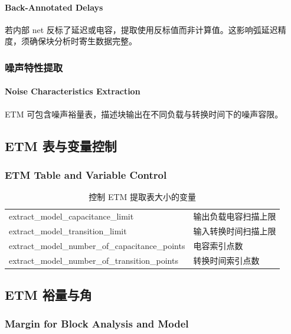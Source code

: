 \paragraph*{Back-Annotated Delays}

若内部 net 反标了延迟或电容，提取使用反标值而非计算值。这影响弧延迟精度，须确保块分析时寄生数据完整。

\subsubsection{噪声特性提取}
\paragraph*{Noise Characteristics Extraction}

ETM 可包含噪声裕量表，描述块输出在不同负载与转换时间下的噪声容限。

\subsection{ETM 表与变量控制}
\subsubsection*{ETM Table and Variable Control}

\begin{table}[htbp]
\centering
\caption{控制 ETM 提取表大小的变量}
\small
\begin{tabular}{|L{0.45\textwidth}|L{0.45\textwidth}|}
\hline
{} &  \\
\hline
extract\_model\_capacitance\_limit & 输出负载电容扫描上限 \\
extract\_model\_transition\_limit & 输入转换时间扫描上限 \\
extract\_model\_number\_of\_capacitance\_points & 电容索引点数 \\
extract\_model\_number\_of\_transition\_points & 转换时间索引点数 \\
\hline
\end{tabular}
\end{table}

\subsection{ETM 裕量与角}
\subsubsection*{Margin for Block Analysis and Model}

